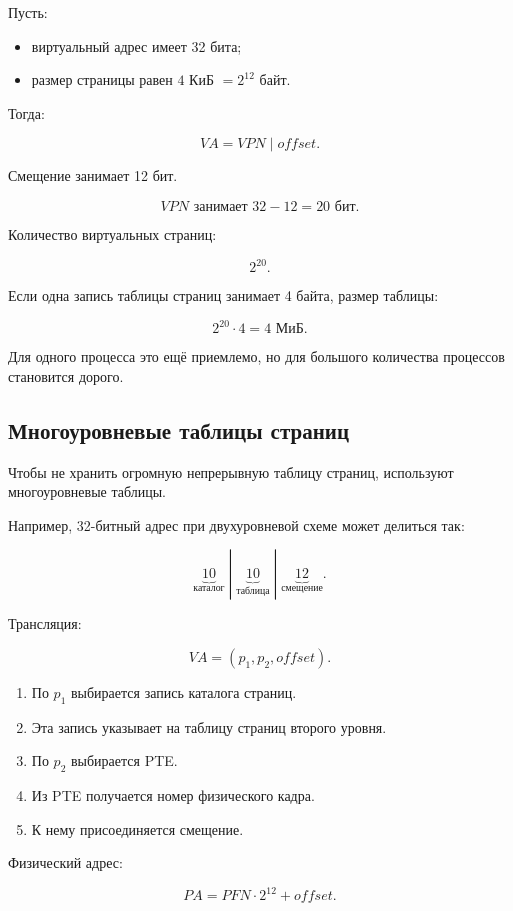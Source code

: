\documentclass[a4paper,12pt]{article}
\begin{document}
Пусть:

\begin{itemize}
    \item виртуальный адрес имеет 32 бита;
    \item размер страницы равен $4$ КиБ $= 2^{12}$ байт.
\end{itemize}

Тогда:

\[
VA = VPN \;|\; offset.
\]

Смещение занимает 12 бит.

\[
VPN \text{ занимает } 32 - 12 = 20 \text{ бит}.
\]

Количество виртуальных страниц:

\[
2^{20}.
\]

Если одна запись таблицы страниц занимает 4 байта, размер таблицы:

\[
2^{20} \cdot 4 = 4 \text{ МиБ}.
\]

Для одного процесса это ещё приемлемо, но для большого количества процессов становится дорого.

\subsection{Многоуровневые таблицы страниц}

Чтобы не хранить огромную непрерывную таблицу страниц, используют многоуровневые таблицы.

Например, 32-битный адрес при двухуровневой схеме может делиться так:

\[
\underbrace{10}_{\text{каталог}}
\;|\;
\underbrace{10}_{\text{таблица}}
\;|\;
\underbrace{12}_{\text{смещение}}.
\]

Трансляция:

\[
VA = (p_1, p_2, offset).
\]

\begin{enumerate}
    \item По $p_1$ выбирается запись каталога страниц.
    \item Эта запись указывает на таблицу страниц второго уровня.
    \item По $p_2$ выбирается PTE.
    \item Из PTE получается номер физического кадра.
    \item К нему присоединяется смещение.
\end{enumerate}

Физический адрес:

\[
PA = PFN \cdot 2^{12} + offset.
\]
\end{document}
